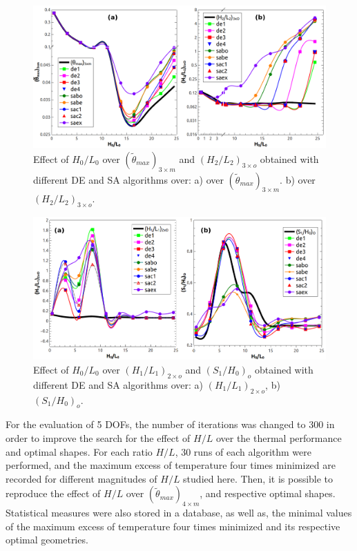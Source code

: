 \documentclass[12pt,fleqn]{article}
\begin{document}
\begin{figure}[H]
\centering
\includegraphics[width=0.9\linewidth]{imgs/4dof/de_sa_h0l0-tmin-4dof.png}
\caption{ {\small Effect of $H_{0}/L_{0}$ over $(\tilde{\theta}_{max})_{3\times m}$ and $(H_{2}/L_{2})_{3\times o}$ obtained with different DE and SA algorithms over:  a) over $(\tilde{\theta}_{max})_{3\times m}$. b) over $(H_{2}/L_{2})_{3\times o}$. }}
\label{figure02}
\end{figure}

\begin{figure}[H]
\centering
\includegraphics[width=0.9\linewidth]{imgs/4dof/de_sa_h0l0-h1l1-s1h0-4dof.png}
\caption{ {\small Effect of $H_{0}/L_{0}$ over $(H_{1}/L_{1})_{2\times o}$ and $(S_{1}/H_{0})_{o}$ obtained with different DE and SA algorithms over: a) $(H_{1}/L_{1})_{2\times o}$, b) $(S_{1}/H_{0})_{o}$. }}
\label{figure03}
\end{figure}

For the evaluation of 5 DOFs, the number of iterations was changed to 300 in order to improve the search for the effect of $H/L$ over the thermal performance and optimal shapes. For each ratio $H/L$, 30 runs of each algorithm were performed, and the maximum excess of temperature four times minimized are recorded for different magnitudes of $H/L$ studied here. Then, it is possible to reproduce the effect of $H/L$ over $(\tilde{\theta}_{max})_{4\times m}$, and respective optimal shapes. Statistical measures were also stored in a database, as well as, the minimal values of the maximum excess of temperature four times minimized and its respective optimal geometries.
\end{document}
